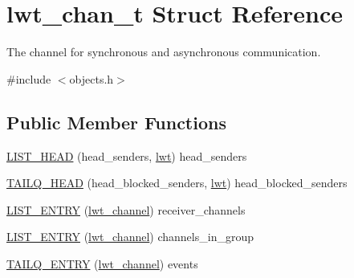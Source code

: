 \hypertarget{structlwt__channel}{\section{lwt\+\_\+chan\+\_\+t Struct Reference}
\label{structlwt__channel}
}


The channel for synchronous and asynchronous communication.  




{\ttfamily \#include $<$objects.\+h$>$}

\subsection*{Public Member Functions}
\begin{DoxyCompactItemize}
\item 
\hyperlink{structlwt__channel_a7149db44c4ebef09399fcd9e5ec67403}{L\+I\+S\+T\+\_\+\+H\+E\+A\+D} (head\+\_\+senders, \hyperlink{structlwt}{lwt}) head\+\_\+senders
\item 
\hyperlink{structlwt__channel_abdec72b57a7528a774c78de59bd4b169}{T\+A\+I\+L\+Q\+\_\+\+H\+E\+A\+D} (head\+\_\+blocked\+\_\+senders, \hyperlink{structlwt}{lwt}) head\+\_\+blocked\+\_\+senders
\item 
\hyperlink{structlwt__channel_aff4f575f1971a0fecc1230a39e163f90}{L\+I\+S\+T\+\_\+\+E\+N\+T\+R\+Y} (\hyperlink{structlwt__channel}{lwt\+\_\+channel}) receiver\+\_\+channels
\item 
\hyperlink{structlwt__channel_a94c92aa321f4f764d14bec7b8929d97a}{L\+I\+S\+T\+\_\+\+E\+N\+T\+R\+Y} (\hyperlink{structlwt__channel}{lwt\+\_\+channel}) channels\+\_\+in\+\_\+group
\item 
\hyperlink{structlwt__channel_a31f40fa92a27252dfe7ffe767c4a15e0}{T\+A\+I\+L\+Q\+\_\+\+E\+N\+T\+R\+Y} (\hyperlink{structlwt__channel}{lwt\+\_\+channel}) events
\end{DoxyCompactItemize}
